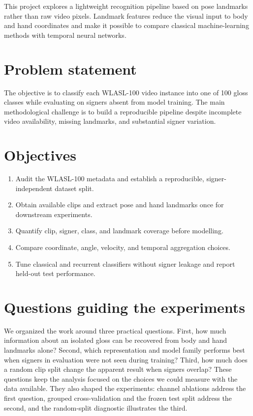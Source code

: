 \documentclass[12pt,a4paper,oneside]{report}
\begin{document}
This project explores a lightweight recognition pipeline based on pose landmarks rather than raw video pixels. Landmark features reduce the visual input to body and hand coordinates and make it possible to compare classical machine-learning methods with temporal neural networks.

\section{Problem statement}
The objective is to classify each WLASL-100 video instance into one of 100 gloss classes while evaluating on signers absent from model training. The main methodological challenge is to build a reproducible pipeline despite incomplete video availability, missing landmarks, and substantial signer variation.

\section{Objectives}
\begin{enumerate}[leftmargin=*]
  \item Audit the WLASL-100 metadata and establish a reproducible, signer-independent dataset split.
  \item Obtain available clips and extract pose and hand landmarks once for downstream experiments.
  \item Quantify clip, signer, class, and landmark coverage before modelling.
  \item Compare coordinate, angle, velocity, and temporal aggregation choices.
  \item Tune classical and recurrent classifiers without signer leakage and report held-out test performance.
\end{enumerate}

\section{Questions guiding the experiments}
We organized the work around three practical questions. First, how much information about an isolated gloss can be recovered from body and hand landmarks alone? Second, which representation and model family performs best when signers in evaluation were not seen during training? Third, how much does a random clip split change the apparent result when signers overlap? These questions keep the analysis focused on the choices we could measure with the data available. They also shaped the experiments: channel ablations address the first question, grouped cross-validation and the frozen test split address the second, and the random-split diagnostic illustrates the third.
\end{document}
